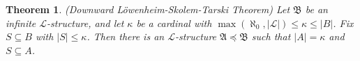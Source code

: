 \documentclass{report}
\newtheorem{theorem}{Theorem}[section]
\theoremstyle{definition}
\theoremstyle{remark}
\newcommand{\lang}{\mathcal{L}}
\newcommand{\struct}[1]{\mathfrak{#1}}
\newcommand{\submodel}{\preccurlyeq}
\let\oldmax\max
\renewcommand{\max}[1]{\oldmax \left( #1 \right)}
\begin{document}
\begin{theorem} ({Downward Löwenheim-Skolem-Tarski Theorem})
    Let $\struct{B}$ be an infinite $\lang$-structure, and let $\kappa$ be a cardinal with $\max{\aleph_0, |\lang|} \leq \kappa \leq |B|$. Fix $S \subseteq B$ with $|S| \leq \kappa$. Then there is an $\lang$-structure $\struct{A} \submodel \struct{B}$ such that $|A| = \kappa$ and $S \subseteq A$.
\end{theorem}
\end{document}
